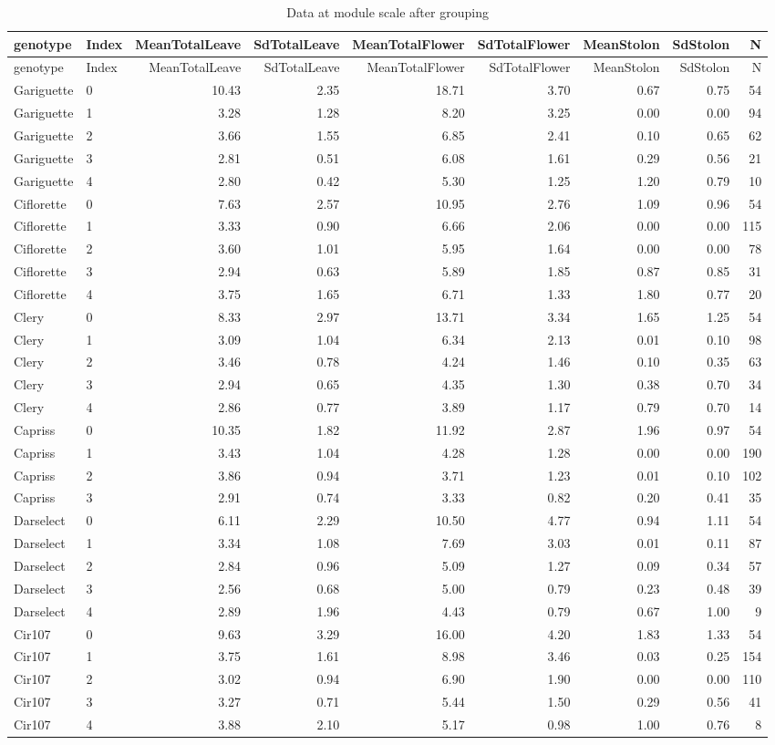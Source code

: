 \documentclass[]{article}
\begin{document}
\begin{longtable}[]{@{}llrrrrrrr@{}}
\caption{Data at module scale after grouping}\tabularnewline
\toprule
genotype & Index & MeanTotalLeave & SdTotalLeave & MeanTotalFlower &
SdTotalFlower & MeanStolon & SdStolon & N\tabularnewline
\midrule
\endfirsthead
\toprule
genotype & Index & MeanTotalLeave & SdTotalLeave & MeanTotalFlower &
SdTotalFlower & MeanStolon & SdStolon & N\tabularnewline
\midrule
\endhead
Gariguette & 0 & 10.43 & 2.35 & 18.71 & 3.70 & 0.67 & 0.75 &
54\tabularnewline
Gariguette & 1 & 3.28 & 1.28 & 8.20 & 3.25 & 0.00 & 0.00 &
94\tabularnewline
Gariguette & 2 & 3.66 & 1.55 & 6.85 & 2.41 & 0.10 & 0.65 &
62\tabularnewline
Gariguette & 3 & 2.81 & 0.51 & 6.08 & 1.61 & 0.29 & 0.56 &
21\tabularnewline
Gariguette & 4 & 2.80 & 0.42 & 5.30 & 1.25 & 1.20 & 0.79 &
10\tabularnewline
Ciflorette & 0 & 7.63 & 2.57 & 10.95 & 2.76 & 1.09 & 0.96 &
54\tabularnewline
Ciflorette & 1 & 3.33 & 0.90 & 6.66 & 2.06 & 0.00 & 0.00 &
115\tabularnewline
Ciflorette & 2 & 3.60 & 1.01 & 5.95 & 1.64 & 0.00 & 0.00 &
78\tabularnewline
Ciflorette & 3 & 2.94 & 0.63 & 5.89 & 1.85 & 0.87 & 0.85 &
31\tabularnewline
Ciflorette & 4 & 3.75 & 1.65 & 6.71 & 1.33 & 1.80 & 0.77 &
20\tabularnewline
Clery & 0 & 8.33 & 2.97 & 13.71 & 3.34 & 1.65 & 1.25 & 54\tabularnewline
Clery & 1 & 3.09 & 1.04 & 6.34 & 2.13 & 0.01 & 0.10 & 98\tabularnewline
Clery & 2 & 3.46 & 0.78 & 4.24 & 1.46 & 0.10 & 0.35 & 63\tabularnewline
Clery & 3 & 2.94 & 0.65 & 4.35 & 1.30 & 0.38 & 0.70 & 34\tabularnewline
Clery & 4 & 2.86 & 0.77 & 3.89 & 1.17 & 0.79 & 0.70 & 14\tabularnewline
Capriss & 0 & 10.35 & 1.82 & 11.92 & 2.87 & 1.96 & 0.97 &
54\tabularnewline
Capriss & 1 & 3.43 & 1.04 & 4.28 & 1.28 & 0.00 & 0.00 &
190\tabularnewline
Capriss & 2 & 3.86 & 0.94 & 3.71 & 1.23 & 0.01 & 0.10 &
102\tabularnewline
Capriss & 3 & 2.91 & 0.74 & 3.33 & 0.82 & 0.20 & 0.41 &
35\tabularnewline
Darselect & 0 & 6.11 & 2.29 & 10.50 & 4.77 & 0.94 & 1.11 &
54\tabularnewline
Darselect & 1 & 3.34 & 1.08 & 7.69 & 3.03 & 0.01 & 0.11 &
87\tabularnewline
Darselect & 2 & 2.84 & 0.96 & 5.09 & 1.27 & 0.09 & 0.34 &
57\tabularnewline
Darselect & 3 & 2.56 & 0.68 & 5.00 & 0.79 & 0.23 & 0.48 &
39\tabularnewline
Darselect & 4 & 2.89 & 1.96 & 4.43 & 0.79 & 0.67 & 1.00 &
9\tabularnewline
Cir107 & 0 & 9.63 & 3.29 & 16.00 & 4.20 & 1.83 & 1.33 &
54\tabularnewline
Cir107 & 1 & 3.75 & 1.61 & 8.98 & 3.46 & 0.03 & 0.25 &
154\tabularnewline
Cir107 & 2 & 3.02 & 0.94 & 6.90 & 1.90 & 0.00 & 0.00 &
110\tabularnewline
Cir107 & 3 & 3.27 & 0.71 & 5.44 & 1.50 & 0.29 & 0.56 & 41\tabularnewline
Cir107 & 4 & 3.88 & 2.10 & 5.17 & 0.98 & 1.00 & 0.76 & 8\tabularnewline
\bottomrule
\end{longtable}
\end{document}
